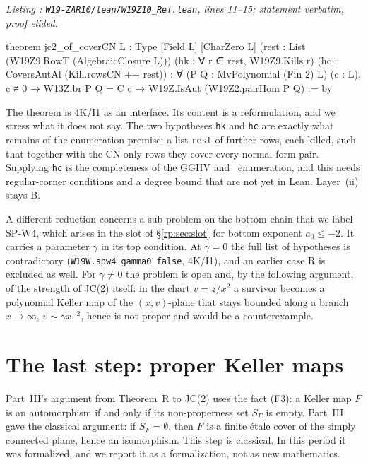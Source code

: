 \documentclass[a4paper,11pt]{article}
\newcounter{leanlisting}
\newenvironment{leanlisting}[2]{%
  \refstepcounter{leanlisting}\label{#2}%
  \begin{center}\textit{\small\color{inksecondary}Listing \theleanlisting: #1}\end{center}%
  \Verbatim[breaklines=true,breakanywhere=true,fontsize=\footnotesize,frame=single,framesep=4pt,rulecolor=\color{borderstrong},fillcolor=\color{bgsubtle}]%
}{%
  \endVerbatim%
}
\theoremstyle{jsplain}
\theoremstyle{jsdef}
\theoremstyle{jsrem}
\begin{document}
\begin{leanlisting}{\texttt{W19-ZAR10/lean/W19Z10\_Ref.lean}, lines 11--15; statement verbatim, proof elided.}{rp:lst:cover}
theorem jc2_of_coverCN {L : Type} [Field L] [CharZero L]
    (rest : List (W19Z9.RowT (AlgebraicClosure L))) (hk : ∀ r ∈ rest, W19Z9.Kills r)
    (hc : CoversAutAl (Kill.rowsCN ++ rest)) :
    ∀ (P Q : MvPolynomial (Fin 2) L) (c : L), c ≠ 0 → W13Z.br P Q = C c →
      W19Z.IsAut (W19Z2.pairHom P Q) := by
\end{leanlisting}

The theorem is 4K/I1 as an interface. Its content is a reformulation, and we stress what it does not say. The two hypotheses \texttt{hk} and \texttt{hc} are exactly what remains of the enumeration premise: a list \texttt{rest} of further rows, each killed, such that together with the CN-only rows they cover every normal-form pair. Supplying \texttt{hc} is the completeness of the GGHV and~\cite{GGV1} enumeration, and this needs regular-corner conditions and a degree bound that are not yet in Lean. Layer~(ii) stays B.

A different reduction concerns a sub-problem on the bottom chain that we label SP-W4, which arises in the slot of \S\ref{rp:sec:slot} for bottom exponent $a_0\le-2$. It carries a parameter $\gamma$ in its top condition. At $\gamma=0$ the full list of hypotheses is contradictory (\texttt{W19W.\allowbreak{}spw4\_\allowbreak{}gamma0\_\allowbreak{}false}, 4K/I1), and an earlier case R is excluded as well. For $\gamma\ne0$ the problem is open and, by the following argument, of the strength of JC(2) itself: in the chart $v=z/x^2$ a survivor becomes a polynomial Keller map of the $(x,v)$-plane that stays bounded along a branch $x\to\infty$, $v\sim\gamma x^{-2}$, hence is not proper and would be a counterexample.

\section{The last step: proper Keller maps}\label{rp:sec:F3}

Part~III's argument from Theorem~R to JC(2) uses the fact (F3): a Keller map $F$ is an automorphism if and only if its non-properness set $S_F$ is empty. Part~III gave the classical argument: if $S_F=\emptyset$, then $F$ is a finite étale cover of the simply connected plane, hence an isomorphism. This step is classical. In this period it was formalized, and we report it as a formalization, not as new mathematics.
\end{document}
